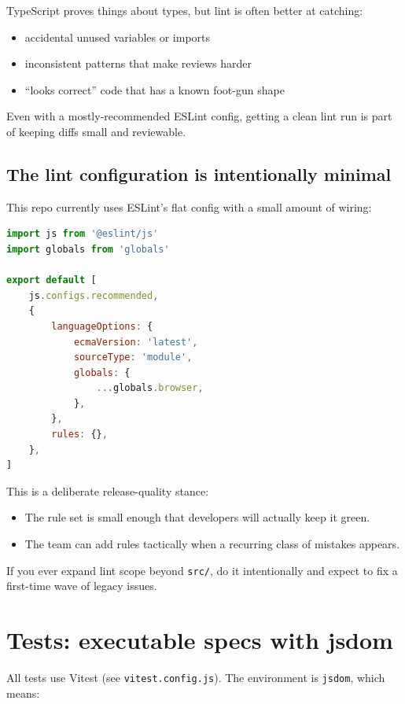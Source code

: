 TypeScript proves things about types, but lint is often better at catching:

\begin{itemize}
\item accidental unused variables or imports
\item inconsistent patterns that make reviews harder
\item ``looks correct'' code that has a known foot-gun shape
\end{itemize}

Even with a mostly-recommended ESLint config, getting a clean lint run is part of keeping diffs small and reviewable.

\subsection{The lint configuration is intentionally minimal}

This repo currently uses ESLint's flat config with a small amount of wiring:

\begin{lstlisting}[language=JavaScript, caption={ESLint flat config (from \texttt{eslint.config.mjs}).}]
import js from '@eslint/js'
import globals from 'globals'

export default [
	js.configs.recommended,
	{
		languageOptions: {
			ecmaVersion: 'latest',
			sourceType: 'module',
			globals: {
				...globals.browser,
			},
		},
		rules: {},
	},
]
\end{lstlisting}

This is a deliberate release-quality stance:

\begin{itemize}
\item The rule set is small enough that developers will actually keep it green.
\item The team can add rules tactically when a recurring class of mistakes appears.
\end{itemize}

If you ever expand lint scope beyond \texttt{src/}, do it intentionally and expect to fix a first-time wave of legacy issues.

\section{Tests: executable specs with jsdom}

All tests use Vitest (see \texttt{vitest.config.js}).
The environment is \texttt{jsdom}, which means:

